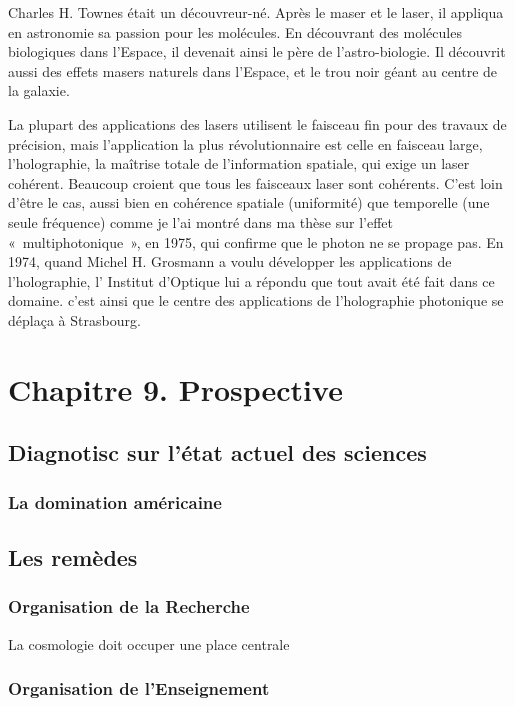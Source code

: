 \documentclass[a4paper,12pt]{article}
\begin{document}
Charles H. Townes était un découvreur-né. Après le maser et le laser, il appliqua en astronomie sa passion pour les molécules. En découvrant des molécules biologiques dans l'Espace, il devenait ainsi le père de l'astro-biologie. Il découvrit aussi des effets masers naturels dans l'Espace, et le trou noir géant au centre de la galaxie.    

La plupart des applications des lasers utilisent le faisceau fin pour des travaux de précision, mais l'application la plus révolutionnaire est celle en faisceau large, l'holographie, la maîtrise totale de l'information spatiale, qui exige un laser cohérent. Beaucoup croient que tous les faisceaux laser sont cohérents. C'est loin d'être le cas, aussi bien en cohérence spatiale (uniformité) que temporelle (une seule fréquence) comme je l'ai montré dans ma thèse sur l'effet « multiphotonique », en 1975, qui confirme que le photon ne se propage pas. En 1974, quand Michel H. Grosmann a voulu développer les applications de l'holographie, l' Institut d'Optique lui a répondu que tout avait été fait dans ce domaine. c'est ainsi que le centre des applications de l'holographie photonique se déplaça à Strasbourg.







\section{Chapitre 9. Prospective}

\subsection {Diagnotisc sur l'état actuel des sciences}
\subsubsection{La domination américaine}



\subsection {Les remèdes} 
\subsubsection {Organisation de la Recherche}
La cosmologie doit occuper une place centrale
\subsubsection {Organisation de l'Enseignement}
\end{document}
